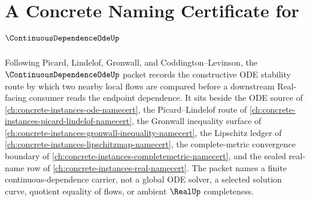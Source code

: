 \chapter{A Concrete Naming Certificate for $\ContinuousDependenceOdeUp$}
\label{ch:concrete-instances-continuous-dependence-ode-namecert}

Following Picard, Lindelof, Gronwall, and Coddington--Levinson, the $\ContinuousDependenceOdeUp$ packet records the constructive ODE stability route by which two nearby local flows are compared before a downstream Real-facing consumer reads the endpoint dependence. It sits beside the ODE source of \autoref{ch:concrete-instances-ode-namecert}, the Picard--Lindelof route of \autoref{ch:concrete-instances-picard-lindelof-namecert}, the Gronwall inequality surface of \autoref{ch:concrete-instances-gronwall-inequality-namecert}, the Lipschitz ledger of \autoref{ch:concrete-instances-lipschitzmap-namecert}, the complete-metric convergence boundary of \autoref{ch:concrete-instances-completemetric-namecert}, and the sealed real-name row of \autoref{ch:concrete-instances-real-namecert}. The packet names a finite continuous-dependence carrier, not a global ODE solver, a selected solution curve, quotient equality of flows, or ambient $\RealUp$ completeness.

